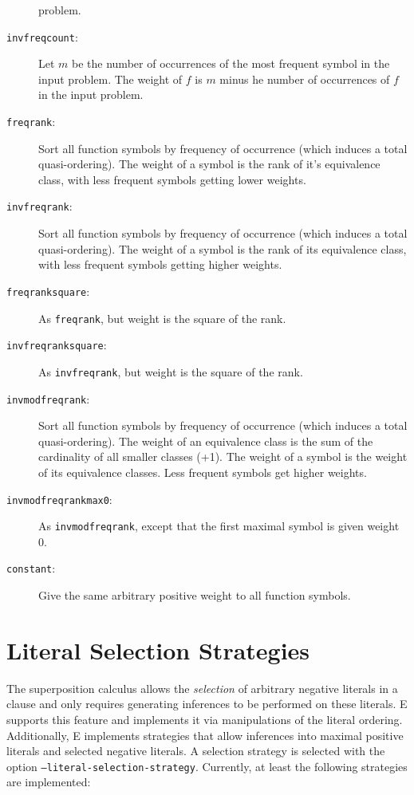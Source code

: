 \documentclass{report}
\begin{document}
\begin{description}
  problem.
\item[\texttt{invfreqcount}:]  Let $m$ be the number of occurrences of
  the most frequent symbol in the input problem. The weight of $f$ is
  $m$ minus he number of occurrences of $f$ in the input problem.
\item[\texttt{freqrank}:] Sort all function symbols by frequency of
  occurrence (which induces a total quasi-ordering). The weight of a
  symbol is the rank of it's equivalence class, with less frequent
  symbols getting lower weights.
\item[\texttt{invfreqrank}:] Sort all function symbols by frequency of
  occurrence (which induces a total quasi-ordering). The weight of a
  symbol is the rank of its equivalence class, with less frequent
  symbols getting higher weights.
\item[\texttt{freqranksquare}:] As \texttt{freqrank}, but weight is
  the square of the rank.
\item[\texttt{invfreqranksquare}:] As \texttt{invfreqrank}, but weight is
  the square of the rank.
\item[\texttt{invmodfreqrank}:] Sort all function symbols by frequency of
  occurrence (which induces a total quasi-ordering). The weight of an
   equivalence class is the sum of the cardinality of all smaller
  classes (+1). The weight of a symbol is the weight of its
  equivalence classes. Less frequent symbols get higher weights.
\item[\texttt{invmodfreqrankmax0}:] As \texttt{invmodfreqrank}, except
  that the first maximal symbol is given weight 0.
\item[\texttt{constant}:] Give the same arbitrary positive weight to
  all function symbols.
\end{description}


\section{Literal Selection Strategies}
\label{sec:options:strategies}

The superposition calculus allows the
\emph{selection} of arbitrary negative
literals in a clause and only requires generating inferences to be
performed on these literals. E supports this feature and implements it
via manipulations of the literal ordering. Additionally, E implements
strategies that allow inferences into maximal positive literals and
selected negative literals. A selection strategy is selected with the
option \texttt{--literal-selection-strategy}.  Currently, at least the
following strategies are implemented:
\end{document}

